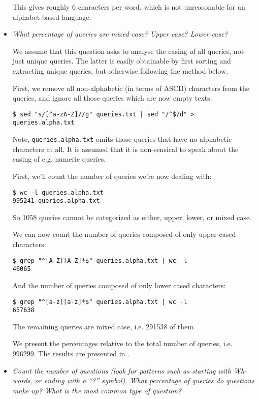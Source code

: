 \begin{itemize}
This gives roughly 6 characters per word, which is not unreasonable for an
alphabet-based language.

\item \emph{What percentage of queries are mixed case? Upper case? Lower case?}

We assume that this question asks to analyse the casing of all queries, not
just unique queries. The latter is easily obtainable by first sorting and
extracting unique queries, but otherwise following the method below.

First, we remove all non-alphabetic (in terms of ASCII) characters from the
queries, and ignore all those queries which are now empty texts:

\begin{lstlisting}
$ sed "s/[^a-zA-Z]//g" queries.txt | sed "/^$/d" > queries.alpha.txt
\end{lstlisting}

Note, \texttt{queries.alpha.txt} omits those queries that have no alphabetic
characters at all. It is assumed that it is non-sensical to speak about the
casing of e.g. numeric queries.

First, we'll count the number of queries we're now dealing with:

\begin{lstlisting}
$ wc -l queries.alpha.txt 
995241 queries.alpha.txt
\end{lstlisting}

So 1058 queries cannot be categorized as either, upper, lower, or mixed case.

We can now count the number of queries composed of only upper cased characters:

\begin{lstlisting}
$ grep "^[A-Z][A-Z]*$" queries.alpha.txt | wc -l
46065
\end{lstlisting}

And the number of queries composed of only lower cased characters:

\begin{lstlisting}
$ grep "^[a-z][a-z]*$" queries.alpha.txt | wc -l
657638
\end{lstlisting}

The remaining queries are mixed case, i.e. 291538 of them.

We present the percentages relative to the total number of queries, i.e.
996299. The results are presented in .

\item \emph{Count the number of questions (look for patterns such as starting
with Wh-words, or ending with a ``?''    symbol). What percentage of queries do
questions make up? What is the most common type of question?}


\end{itemize}
